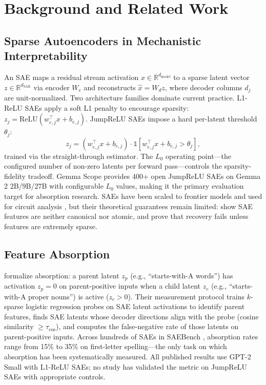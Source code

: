 \documentclass{article}
\begin{document}
\section{Background and Related Work}
\label{sec:background}

\subsection{Sparse Autoencoders in Mechanistic Interpretability}

An SAE maps a residual stream activation $x \in \mathbb{R}^{d_{\text{model}}}$ to a sparse latent vector $z \in \mathbb{R}^{d_{\text{SAE}}}$ via encoder $W_e$ and reconstructs $\hat{x} = W_d z$, where decoder columns $d_j$ are unit-normalized. Two architecture families dominate current practice. L1-ReLU SAEs \citep{cunningham2023sparse, bricken2023monosemanticity} apply a soft L1 penalty to encourage sparsity: $z_j = \text{ReLU}(w_{e,j}^\top x + b_{e,j})$. JumpReLU SAEs \citep{rajamanoharan2024jumprelu} impose a hard per-latent threshold $\theta_j$:
\begin{equation}
z_j = (w_{e,j}^\top x + b_{e,j}) \cdot \mathbb{1}[w_{e,j}^\top x + b_{e,j} > \theta_j],
\end{equation}
trained via the straight-through estimator. The $L_0$ operating point---the configured number of non-zero latents per forward pass---controls the sparsity-fidelity tradeoff. Gemma Scope \citep{lieberum2024gemmascope} provides 400+ open JumpReLU SAEs on Gemma 2 2B/9B/27B with configurable $L_0$ values, making it the primary evaluation target for absorption research. SAEs have been scaled to frontier models \citep{templeton2024scaling, gao2024topk} and used for circuit analysis \citep{lindsey2025circuits}, but their theoretical guarantees remain limited: \citet{leask2025canonical} show SAE features are neither canonical nor atomic, and \citet{cui2025recovery} prove that recovery fails unless features are extremely sparse.

\subsection{Feature Absorption}

\citet{chanin2024absorption} formalize absorption: a parent latent $z_p$ (e.g., ``starts-with-A words'') has activation $z_p = 0$ on parent-positive inputs when a child latent $z_c$ (e.g., ``starts-with-A proper nouns'') is active ($z_c > 0$). Their measurement protocol trains $k$-sparse logistic regression probes on SAE latent activations to identify parent features, finds SAE latents whose decoder directions align with the probe (cosine similarity $\geq \tau_{\cos}$), and computes the false-negative rate of those latents on parent-positive inputs. Across hundreds of SAEs in SAEBench \citep{karvonen2025saebench}, absorption rates range from 15\% to 35\% on first-letter spelling---the only task on which absorption has been systematically measured. All published results use GPT-2 Small with L1-ReLU SAEs; no study has validated the metric on JumpReLU SAEs with appropriate controls.
\end{document}
